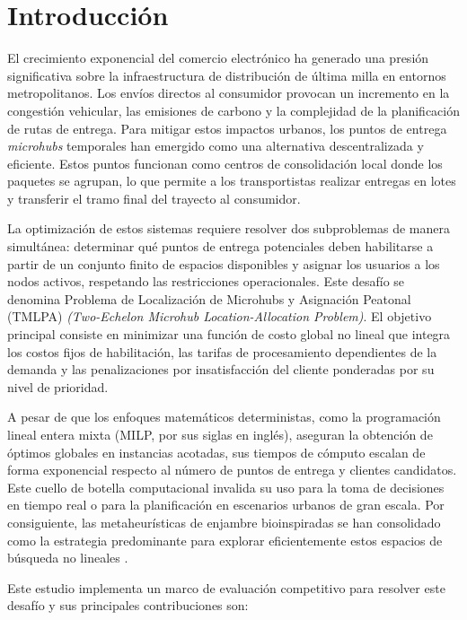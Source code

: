 \documentclass[final,5p,times,twocolumn]{elsarticle}
\begin{document}
\section{Introducción}
\label{sec:introduction}
El crecimiento exponencial del comercio electrónico ha generado una presión significativa sobre la infraestructura de distribución de última milla en entornos metropolitanos. Los envíos directos al consumidor provocan un incremento en la congestión vehicular, las emisiones de carbono y la complejidad de la planificación de rutas de entrega. Para mitigar estos impactos urbanos, los puntos de entrega \textit{microhubs} temporales han emergido como una alternativa descentralizada y eficiente. Estos puntos funcionan como centros de consolidación local donde los paquetes se agrupan, lo que permite a los transportistas realizar entregas en lotes y transferir el tramo final del trayecto al consumidor.

La optimización de estos sistemas requiere resolver dos subproblemas de manera simultánea: determinar qué puntos de entrega potenciales deben habilitarse a partir de un conjunto finito de espacios disponibles y asignar los usuarios a los nodos activos, respetando las restricciones operacionales. Este desafío se denomina Problema de Localización de Microhubs y Asignación Peatonal (TMLPA) \textit{(Two-Echelon Microhub Location-Allocation Problem)}. El objetivo principal consiste en minimizar una función de costo global no lineal que integra los costos fijos de habilitación, las tarifas de procesamiento dependientes de la demanda y las penalizaciones por insatisfacción del cliente ponderadas por su nivel de prioridad.

A pesar de que los enfoques matemáticos deterministas, como la programación lineal entera mixta (MILP, por sus siglas en inglés), aseguran la obtención de óptimos globales en instancias acotadas, sus tiempos de cómputo escalan de forma exponencial respecto al número de puntos de entrega y clientes candidatos. Este cuello de botella computacional invalida su uso para la toma de decisiones en tiempo real o para la planificación en escenarios urbanos de gran escala. Por consiguiente, las metaheurísticas de enjambre bioinspiradas se han consolidado como la estrategia predominante para explorar eficientemente estos espacios de búsqueda no lineales \cite{Shami2022}.

Este estudio implementa un marco de evaluación competitivo para resolver este desafío y sus principales contribuciones son:
\end{document}
